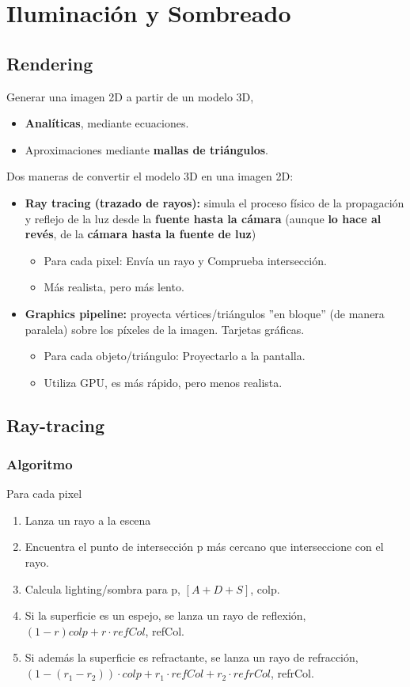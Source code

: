 \chapter{Iluminación y Sombreado}
\section{Rendering}
Generar una imagen 2D a partir de un modelo 3D,
\begin{itemize}
    \item \textbf{Analíticas}, mediante ecuaciones.
    \item Aproximaciones mediante \textbf{mallas de triángulos}.
\end{itemize}

Dos maneras de convertir el modelo 3D en una imagen 2D:
\begin{itemize}
    \item \textbf{Ray tracing (trazado de rayos):} simula el proceso físico de la propagación y reflejo de la luz desde la \textbf{fuente hasta la cámara} (aunque \textbf{lo hace al revés}, de la \textbf{cámara hasta la fuente de luz})
    \begin{itemize}
        \item Para cada pixel: Envía un rayo y Comprueba intersección.
        \item Más realista, pero más lento.
    \end{itemize}
    \item \textbf{Graphics pipeline:} proyecta vértices/triángulos ''en bloque'' (de manera paralela) sobre los píxeles de la imagen. Tarjetas gráficas.
    \begin{itemize}
        \item Para cada objeto/triángulo: Proyectarlo a la pantalla.
        \item Utiliza GPU, es más rápido, pero menos realista.
    \end{itemize}
\end{itemize}

\section{Ray-tracing}
\subsection{Algoritmo}
Para cada pixel
\begin{enumerate}
    \item Lanza un rayo a la escena
    \item Encuentra el punto de intersección p más cercano que interseccione con el rayo.
    \item Calcula lighting/sombra para p, $[A+D+S]$, colp.
    \item Si la superficie es un espejo, se lanza un rayo de reflexión, $(1-r)colp+ r\cdot refCol$, refCol.
    \item Si además la superficie es refractante, se lanza un rayo de refracción, $(1-(r_1-r_2))\cdot colp + r_1\cdot refCol +r_2\cdot refrCol$, refrCol.
\end{enumerate}
